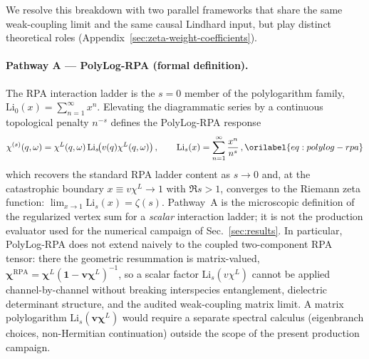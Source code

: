 \documentclass[aps,showkeys,noshowpacs,superscriptaddress,pre,preprint]{revtex4-2}
\let\label\orilabel
\begin{document}
We resolve this breakdown with two parallel frameworks that share the same weak-coupling limit and the same causal Lindhard input, but play distinct theoretical roles (Appendix~\ref{sec:zeta-weight-coefficients}).

\paragraph{Pathway A --- PolyLog-RPA (formal definition).}
The RPA interaction ladder is the $s=0$ member of the polylogarithm family,
$\mathrm{Li}_0(x)=\sum_{n=1}^{\infty}x^n$. Elevating the diagrammatic series by a continuous topological penalty $n^{-s}$ defines the PolyLog-RPA response
\begin{equation}
\chi^{(s)}(q,\omega)
=
\chi^L(q,\omega)\,
\mathrm{Li}_s\!\bigl(v(q)\chi^L(q,\omega)\bigr)\,,
\qquad
\mathrm{Li}_s(x)=\sum_{n=1}^{\infty}\frac{x^n}{n^s}\,,
\label{eq:polylog-rpa}
\end{equation}
which recovers the standard RPA ladder content as $s\to 0$ and, at the catastrophic boundary $x\equiv v\chi^L\to 1$ with $\Re s>1$, converges to the Riemann zeta function:
$\lim_{x\to 1}\mathrm{Li}_s(x)=\zeta(s)$.
Pathway~A is the microscopic definition of the regularized vertex sum for a \emph{scalar} interaction ladder; it is not the production evaluator used for the numerical campaign of Sec.~\ref{sec:results}.
In particular, PolyLog-RPA does not extend naively to the coupled two-component RPA tensor:
there the geometric resummation is matrix-valued,
$\boldsymbol{\chi}^{\mathrm{RPA}}=\boldsymbol{\chi}^{L}(\mathbf{1}-\mathbf{v}\boldsymbol{\chi}^{L})^{-1}$,
so a scalar factor $\mathrm{Li}_s(v\chi^L)$ cannot be applied channel-by-channel without breaking interspecies entanglement, dielectric determinant structure, and the audited weak-coupling matrix limit.
A matrix polylogarithm $\mathrm{Li}_s(\mathbf{v}\boldsymbol{\chi}^{L})$ would require a separate spectral calculus (eigenbranch choices, non-Hermitian continuation) outside the scope of the present production campaign.
\end{document}
